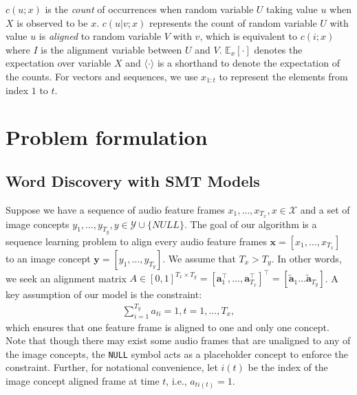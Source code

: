 \documentclass[journal]{IEEEtran}
\begin{document}
$c(u; x)$ is the \textit{count} of occurrences when random variable $U$ taking value $u$ when $X$ is observed to be $x$. $c(u|v; x)$ represents the count of random variable $U$ with value $u$ is \textit{aligned} to random variable $V$ with $v$, which is equivalent to $c(i; x)$ where $I$ is the alignment variable between $U$ and $V$. $\mathbb E_x[\cdot]$ denotes the expectation over variable $X$ and $\langle \cdot \rangle$ is a shorthand to denote the expectation of the counts. For vectors and sequences, we use $x_{1:t}$ to represent the elements from index $1$ to $t$. 

\section{Problem formulation}
\subsection{Word Discovery with SMT Models}
Suppose we have a sequence of audio feature frames $x_1, \ldots, x_{T_x}, x \in \mathcal X$ and a set of image concepts $y_1, \ldots, y_{T_y}, y \in \mathcal Y \cup \{NULL\}$. The goal of our algorithm is a sequence learning problem to align every audio feature frames $\mathbf x = [x_1, \ldots, x_{T_x}]$ to an image concept $\mathbf y = [y_1, \ldots, y_{T_y}]$.  We assume that $T_x > T_y$. In other words, we seek an alignment matrix $A \in [0, 1]^{T_x \times T_y}=[\mathbf a_1^\top, \ldots, \mathbf a_{T_x}^{\top}]^{\top} = [\tilde{\mathbf a}_1 \ldots \tilde{\mathbf a}_{T_y}]$. A key assumption of our model is the constraint:
\begin{align}\label{eq:one-concept-assumption}
    \sum_{i=1}^{T_y} a_{ti} = 1, t = 1, \ldots, T_x,
\end{align}
which ensures that one feature frame is aligned to one and only one concept. Note that though there may exist some audio frames that are unaligned to any of the image concepts, the \texttt{NULL} symbol acts as a placeholder concept to enforce the constraint. Further, for notational convenience, let $i(t)$ be the index of the image concept aligned frame at time $t$, i.e., $a_{ti(t)} = 1$. 
\end{document}
